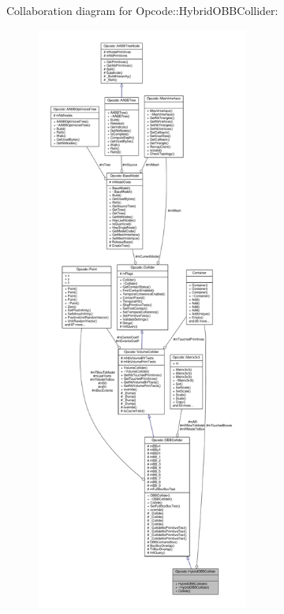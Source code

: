 Collaboration diagram for Opcode\+:\+:Hybrid\+O\+B\+B\+Collider\+:
\nopagebreak
\begin{figure}[H]
\begin{center}
\leavevmode
\includegraphics[height=550pt]{df/d57/classOpcode_1_1HybridOBBCollider__coll__graph}
\end{center}
\end{figure}
